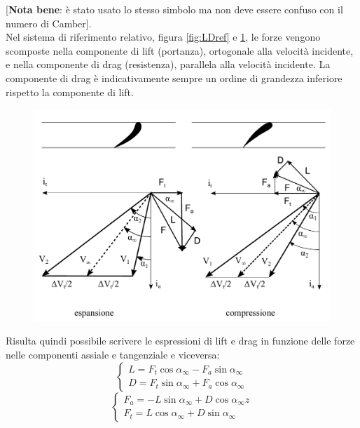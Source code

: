 [\textbf{Nota bene}: è stato usato lo stesso simbolo ma non deve essere confuso con il numero di Camber].\\
Nel sistema di riferimento relativo, figura \ref{fig:LDref} e \ref{fig:triang1}, le forze vengono scomposte nella componente di lift (portanza), ortogonale alla velocità incidente, e nella componente di drag (resistenza), parallela alla velocità incidente. La componente di drag è indicativamente sempre un ordine di grandezza inferiore rispetto la componente di lift.
\begin{figure}
\centering
  \includegraphics[width=.7\textwidth]{fig/triang1.pdf}
\caption{}
\label{fig:triang1}
\end{figure}
Risulta quindi possibile scrivere le espressioni di lift e drag in funzione delle forze nelle componenti assiale e tangenziale e viceversa:
\begin{equation}\label{eq:c_L}
	\begin{cases} 
		L = F_t \cos \alpha_{\infty} -  F_a \sin \alpha_{\infty}\\
		D = F_t \sin \alpha_{\infty} +  F_a \cos \alpha_{\infty}
	\end{cases}
\end{equation}
\begin{equation}
	\begin{cases} 
		F_a = - L\sin \alpha_{\infty} +  D \cos \alpha_{\infty}z\\
		F_t = L \cos \alpha_{\infty} +  D \sin \alpha_{\infty}
	\end{cases}
\end{equation}
